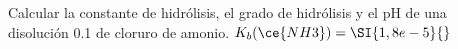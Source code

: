 Calcular la constante de hidrólisis, el grado de hidrólisis y el pH de una disolución \SI{0,1}{\Molar} de cloruro de amonio. $K_b(\ce{NH3}) = \SI{1,8e-5}{}$
